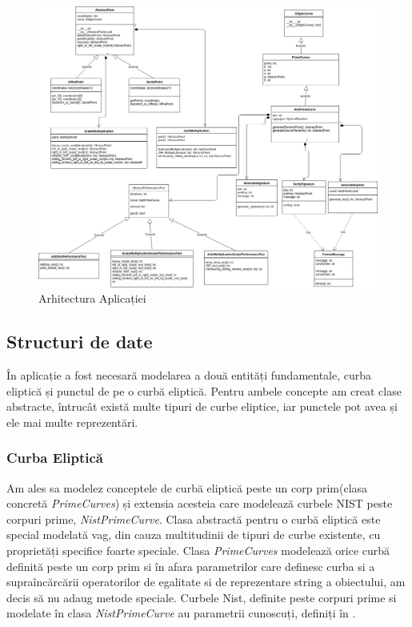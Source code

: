 \begin{figure}[htp]
\centering
\includegraphics[width=17.5cm]{chapters/Arhitectura.png}
\caption{Arhitectura Aplicației}
\label{fig:lion}
\end{figure}

\subsection{Structuri de date}

În aplicație a fost necesară modelarea a două entități fundamentale, curba eliptică și punctul de pe o curbă eliptică. Pentru ambele concepte am creat clase abstracte, întrucât există multe tipuri de curbe eliptice, iar punctele pot avea și ele mai multe reprezentări.

\subsubsection{Curba Eliptică}
Am ales sa modelez conceptele de curbă eliptică peste un corp prim(clasa concretă \textit{PrimeCurves}) și extensia acesteia care modelează curbele NIST peste corpuri prime, \textit{NistPrimeCurve}. Clasa abstractă pentru o curbă eliptică este special modelată vag, din cauza multitudinii de tipuri de curbe existente, cu proprietăți specifice foarte speciale. Clasa \textit{PrimeCurves} modelează orice curbă definită peste un corp prim si în afara parametrilor care definesc curba si a supraîncărcării operatorilor de egalitate si de reprezentare string a obiectului, am decis să nu adaug metode speciale. Curbele Nist, definite peste corpuri prime si modelate în clasa \textit{NistPrimeCurve} au parametrii cunoscuți, definiți în \cite{nist}.

